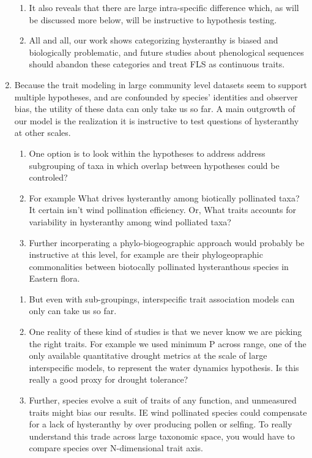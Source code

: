 \documentclass[12pt]{article}\usepackage[]{graphicx}\usepackage[]{color}
\begin{document}
\begin{enumerate}
\begin{enumerate}
\item It also reveals that there are large intra-specific difference which, as will be discussed more below, will be instructive to hypothesis testing.
\item All and all, our work shows categorizing hysteranthy is biased and biologically problematic, and future studies about phenological sequences should abandon these categories and treat FLS as continuous traits.
\end{enumerate}
\item Because the trait modeling in large community level datasets seem to support multiple hypotheses, and are confounded by species' identities and observer bias, the utility of these data can only take us so far. A main outgrowth of our model is the realization it is instructive to test questions of hysteranthy at other scales.
\begin{enumerate}
\item One option is to look within the hypotheses to address address subgrouping of taxa in which overlap between hypotheses could be controled?
\item  For example What drives hysteranthy among biotically pollinated taxa? It certain isn't wind pollination efficiency.  Or, What traits accounts for variability in hysteranthy among wind polliated taxa?
\item Further incorperating a phylo-biogeographic approach would probably be instructive at this level, for example are their phylogeopraphic commonalities between biotocally pollinated hysteranthous species in Eastern flora.
\end{enumerate}
\begin{enumerate}
\item But even with sub-groupings,  interspecific trait association models can only can take us so far. 
\item One reality of these kind of studies is that we never know we are picking the right traits. For example we used minimum P across range, one of the only available quantitative drought metrics at the scale of large interspecific models, to represent the water dynamics hypothesis. Is this really a good proxy for drought tolerance?
\item Further, species evolve a suit of traits of any function, and unmeasured traits might bias our results. IE wind pollinated species could compensate for a lack of hysteranthy by over producing pollen  or selfing. To really understand this trade across large taxonomic space, you would have to compare species over N-dimensional trait axis.

\end{enumerate}
\end{enumerate}
\end{document}
